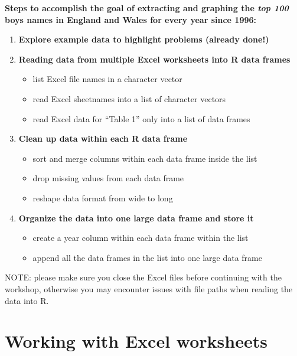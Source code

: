 \documentclass[
]{book}
\providecommand{\tightlist}{%
  \setlength{\itemsep}{0pt}\setlength{\parskip}{0pt}}
\begin{document}
\begin{alert}

\textbf{Steps to accomplish the goal of extracting and graphing the \emph{top 100} boys names in England and Wales for every year since 1996:}

\begin{enumerate}
\def\labelenumi{\arabic{enumi}.}
\setcounter{enumi}{-1}
\item
  \textbf{Explore example data to highlight problems (already done!)}
\item
  \textbf{Reading data from multiple Excel worksheets into R data frames}

  \begin{itemize}
  \tightlist
  \item
    list Excel file names in a character vector
  \item
    read Excel sheetnames into a list of character vectors
  \item
    read Excel data for ``Table 1'' only into a list of data frames
  \end{itemize}
\item
  \textbf{Clean up data within each R data frame}

  \begin{itemize}
  \tightlist
  \item
    sort and merge columns within each data frame inside the list
  \item
    drop missing values from each data frame
  \item
    reshape data format from wide to long
  \end{itemize}
\item
  \textbf{Organize the data into one large data frame and store it}

  \begin{itemize}
  \tightlist
  \item
    create a year column within each data frame within the list
  \item
    append all the data frames in the list into one large data frame
  \end{itemize}
\end{enumerate}

\end{alert}

NOTE: please make sure you close the Excel files before continuing with the workshop, otherwise you may encounter issues with file paths when reading the data into R.

\hypertarget{working-with-excel-worksheets}{%
\section{Working with Excel worksheets}\label{working-with-excel-worksheets}}
\end{document}
